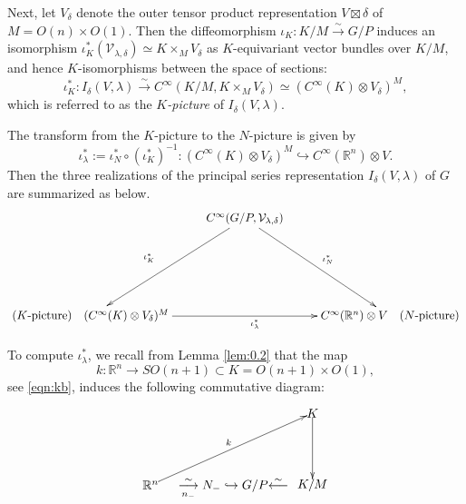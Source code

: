 Next,
 let $V_{\delta}$ denote the outer tensor product representation
 $V \boxtimes \delta$ of $M=O(n) \times O(1)$.  
Then the diffeomorphism
 $\iota_{K} \colon K/M \overset \sim \to G/P$ induces an isomorphism
 $\iota_K^{\ast}({\mathcal{V}}_{\lambda,\delta}) \simeq K \times_M V_{\delta}$
 as $K$-equivariant vector bundles
 over $K/M$, 
 and hence $K$-isomorphisms
 between the space of sections:
\[
  \iota_K^{\ast} \colon
  I_{\delta}(V,\lambda)
  \overset \sim \to
  C^{\infty}(K/M, K \times_M V_{\delta})
  \simeq 
  (C^{\infty}(K) \otimes V_{\delta})^{M}, 
\]
which is referred to as the {\it{$K$-picture}}
 of $I_{\delta}(V,\lambda)$.  



The transform from the $K$-picture to the $N$-picture
 is given by 
\begin{equation}
\label{eqn:KtoN}
  \iota_{\lambda}^{\ast}:=\iota_{N}^{\ast} \circ (\iota_{K}^{\ast})^{-1}
  \colon 
  (C^{\infty}(K) \otimes V_{\delta})^M 
  \hookrightarrow 
  C^{\infty}({\mathbb{R}}^n) \otimes V.  
\end{equation}
Then the three realizations
 of the principal series representation
 $I_{\delta}(V,\lambda)$ of $G$ are summarized as below.  
$$
\xymatrix@R-=1.3pc@C+=0.9cm{
& C^{\infty}(G/P, {\mathcal{V}}_{\lambda,\delta})
\ar[lddd]
\ar[rddd]^{\;\; \iota_N^{\ast}}
&{} 
\\
\qquad\qquad\qquad\qquad\qquad{}_{\iota_K^{\ast}}
&
&
\\
&  
&{}
\\
\text{($K$-picture)}
\quad
(C^{\infty}(K) \otimes V_{\delta})^M 
\ar[rr]_{\hspace{25pt}\iota_{\lambda}^{\ast}}
&{}
&C^{\infty}({\mathbb{R}}^n) \otimes V
\quad
\text{($N$-picture)}
}
$$  



To compute $\iota_{\lambda}^{\ast}$, 
 we recall from Lemma \ref{lem:0.2}
 that the map
\[
     k \colon {\mathbb{R}}^n \to SO(n+1) \subset K =O(n+1) \times O(1), 
\]
 see \eqref{eqn:kb}, 
 induces the following commutative diagram:

\vskip 1pc
\[
\begin{xy}
(0,0) *{{\mathbb{R}}^n}="A",
(23,-1)*{\underset{n_-}{\overset \sim \longrightarrow} N_-
        \hookrightarrow G/P {\overset \sim \longleftarrow}}="D",
(45,0)*{K/M}="B",
(45,20)*{ K }="C",
\ar "C";"B"
\ar^k "A";"C" 
\end{xy}
\]



